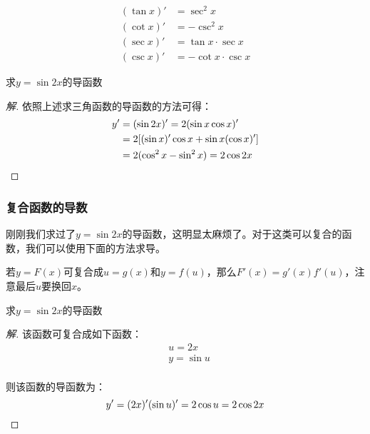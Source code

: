 \[
	\begin{aligned}
		(\tan x)'&=\sec^2x \\
		(\cot x)'&=-\csc^2x \\
		(\sec x)'&=\tan x\cdot\sec x \\
		(\csc x)'&=-\cot x\cdot\csc x
	\end{aligned}
\]

\begin{example}
	求$y=\sin2x$的导函数
\end{example}
\begin{proof}[解]
	依照上述求三角函数的导函数的方法可得：
	\[\begin{aligned}
		y'&=(\sin2x)'=2(\sin x\cos x)' \\
		  &=2[(\sin x)'\cos x+\sin x(\cos x)'] \\
		  &=2(\cos^2x-\sin^2x)=2\cos2x
	\end{aligned}\qedhere\]
\end{proof}

\subsubsection{复合函数的导数}
刚刚我们求过了$y=\sin2x$的导函数，这明显太麻烦了。对于这类可以复合的函数，我们可以使用下面的方法求导。

若$y=F(x)$可复合成$u=g(x)$和$y=f(u)$，那么$F'(x)=g'(x)f'(u)$，注意最后$u$要换回$x$。

\begin{example}
	求$y=\sin2x$的导函数
\end{example}
\begin{proof}[解]
	该函数可复合成如下函数：
	\[\begin{aligned}
		&u=2x \\
		&y=\sin u \\
	\end{aligned}\]

	则该函数的导函数为：\[y'=(2x)'(\sin u)'=2\cos u=2\cos 2x\qedhere\]
\end{proof}
